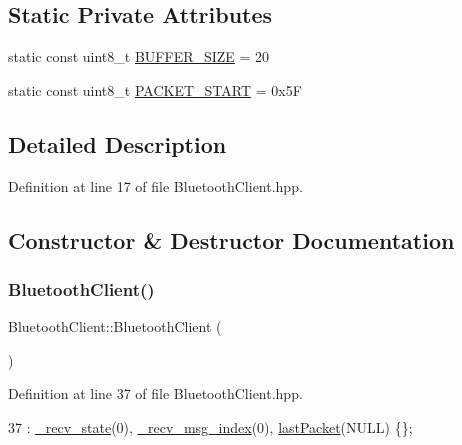 \subsection*{Static Private Attributes}
\begin{DoxyCompactItemize}
\item 
static const uint8\+\_\+t \hyperlink{class_bluetooth_client_a88edb272fc00fb3c65b9e95281cae00b}{B\+U\+F\+F\+E\+R\+\_\+\+S\+I\+ZE} = 20
\item 
static const uint8\+\_\+t \hyperlink{class_bluetooth_client_a4a33990a75d3b22f329fa8fcab00ab03}{P\+A\+C\+K\+E\+T\+\_\+\+S\+T\+A\+RT} = 0x5F
\end{DoxyCompactItemize}


\subsection{Detailed Description}


Definition at line 17 of file Bluetooth\+Client.\+hpp.



\subsection{Constructor \& Destructor Documentation}
\mbox{\label{class_bluetooth_client_a5ee534b5d9823be1e297f037c50beaf6}} 
\subsubsection{\texorpdfstring{Bluetooth\+Client()}{BluetoothClient()}}
{\footnotesize\ttfamily Bluetooth\+Client\+::\+Bluetooth\+Client (\begin{DoxyParamCaption}{ }\end{DoxyParamCaption})\hspace{0.3cm}{\ttfamily [inline]}}



Definition at line 37 of file Bluetooth\+Client.\+hpp.


\begin{DoxyCode}
37 : \hyperlink{class_bluetooth_client_a84f2227913ec4eaf68fe3ccfaaf29d9e}{\_recv\_state}(0), \hyperlink{class_bluetooth_client_a0edb43a0aa23b2b4a9f5a1b94d568ed0}{\_recv\_msg\_index}(0), \hyperlink{class_bluetooth_client_aedcb6766e3a877b5e468ed1347caf483}{lastPacket}(NULL) \{\};
\end{DoxyCode}
\mbox{\label{class_bluetooth_client_a9332d63f912766c70754b5eeb52800bf}} 
